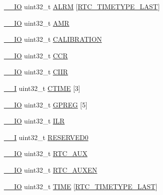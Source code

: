 \begin{DoxyCompactItemize}
\item 
\hyperlink{core__cm3_8h_aec43007d9998a0a0e01faede4133d6be}{\+\_\+\+\_\+\+IO} uint32\+\_\+t \hyperlink{structLPC__RTC__T_abeb0bd5d52ee9f40f515b9b007c7a832}{A\+L\+RM} \mbox{[}\hyperlink{group__RTC__17XX__40XX_gga8144898fe628404d396db06dc8aac0e0a0d4fafef57b6ef363f9a0875ff339cad}{R\+T\+C\+\_\+\+T\+I\+M\+E\+T\+Y\+P\+E\+\_\+\+L\+A\+ST}\mbox{]}
\item 
\hyperlink{core__cm3_8h_aec43007d9998a0a0e01faede4133d6be}{\+\_\+\+\_\+\+IO} uint32\+\_\+t \hyperlink{structLPC__RTC__T_af8b21ae5aa8bedcb0a1dd918678ee389}{A\+MR}
\item 
\hyperlink{core__cm3_8h_aec43007d9998a0a0e01faede4133d6be}{\+\_\+\+\_\+\+IO} uint32\+\_\+t \hyperlink{structLPC__RTC__T_ade5b98ca9e6ea8af2fd91e8a4f20503b}{C\+A\+L\+I\+B\+R\+A\+T\+I\+ON}
\item 
\hyperlink{core__cm3_8h_aec43007d9998a0a0e01faede4133d6be}{\+\_\+\+\_\+\+IO} uint32\+\_\+t \hyperlink{structLPC__RTC__T_ab2117371a628879dbc56f2c1774207b5}{C\+CR}
\item 
\hyperlink{core__cm3_8h_aec43007d9998a0a0e01faede4133d6be}{\+\_\+\+\_\+\+IO} uint32\+\_\+t \hyperlink{structLPC__RTC__T_ac9d2627afcf203dccde2675c6c74d673}{C\+I\+IR}
\item 
\hyperlink{core__cm3_8h_af63697ed9952cc71e1225efe205f6cd3}{\+\_\+\+\_\+I} uint32\+\_\+t \hyperlink{structLPC__RTC__T_a66b166ccd4abefe149e6e3ef6d833554}{C\+T\+I\+ME} \mbox{[}3\mbox{]}
\item 
\hyperlink{core__cm3_8h_aec43007d9998a0a0e01faede4133d6be}{\+\_\+\+\_\+\+IO} uint32\+\_\+t \hyperlink{structLPC__RTC__T_a6624a04c6db73e0f9e53a9bc3cf50c1a}{G\+P\+R\+EG} \mbox{[}5\mbox{]}
\item 
\hyperlink{core__cm3_8h_aec43007d9998a0a0e01faede4133d6be}{\+\_\+\+\_\+\+IO} uint32\+\_\+t \hyperlink{structLPC__RTC__T_a6e1debaa7074a0fae4767a70f9abff29}{I\+LR}
\item 
\hyperlink{core__cm3_8h_af63697ed9952cc71e1225efe205f6cd3}{\+\_\+\+\_\+I} uint32\+\_\+t \hyperlink{structLPC__RTC__T_a94d0c8bf3402d34aac9170bac01bb4fb}{R\+E\+S\+E\+R\+V\+E\+D0}
\item 
\hyperlink{core__cm3_8h_aec43007d9998a0a0e01faede4133d6be}{\+\_\+\+\_\+\+IO} uint32\+\_\+t \hyperlink{structLPC__RTC__T_ab476d508c9ea87e71724c30d36ece294}{R\+T\+C\+\_\+\+A\+UX}
\item 
\hyperlink{core__cm3_8h_aec43007d9998a0a0e01faede4133d6be}{\+\_\+\+\_\+\+IO} uint32\+\_\+t \hyperlink{structLPC__RTC__T_af65651a26ceb3d710ccdba8f762a649f}{R\+T\+C\+\_\+\+A\+U\+X\+EN}
\item 
\hyperlink{core__cm3_8h_aec43007d9998a0a0e01faede4133d6be}{\+\_\+\+\_\+\+IO} uint32\+\_\+t \hyperlink{structLPC__RTC__T_adb4fbf67e8231188ed424c3ce226919e}{T\+I\+ME} \mbox{[}\hyperlink{group__RTC__17XX__40XX_gga8144898fe628404d396db06dc8aac0e0a0d4fafef57b6ef363f9a0875ff339cad}{R\+T\+C\+\_\+\+T\+I\+M\+E\+T\+Y\+P\+E\+\_\+\+L\+A\+ST}\mbox{]}
\end{DoxyCompactItemize}


